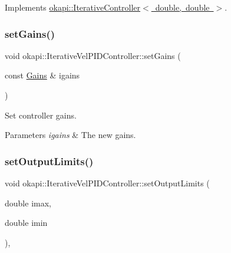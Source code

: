 Implements \mbox{\hyperlink{classokapi_1_1IterativeController_a7c514b702b78be6c45c03b718edce035}{okapi\+::\+Iterative\+Controller$<$ double, double $>$}}.

\mbox{\label{classokapi_1_1IterativeVelPIDController_a0d04321661f6f9e07eecb3e8706cd588}} 
\subsubsection{\texorpdfstring{setGains()}{setGains()}}
{\footnotesize\ttfamily void okapi\+::\+Iterative\+Vel\+P\+I\+D\+Controller\+::set\+Gains (\begin{DoxyParamCaption}\item[{const \mbox{\hyperlink{structokapi_1_1IterativeVelPIDController_1_1Gains}{Gains}} \&}]{igains }\end{DoxyParamCaption})\hspace{0.3cm}{\ttfamily [virtual]}}

Set controller gains.


\begin{DoxyParams}{Parameters}
{\em igains} & The new gains. \\
\hline
\end{DoxyParams}
\mbox{\label{classokapi_1_1IterativeVelPIDController_a02efd865f97b0f2da3f826c1120ec07b}} 
\subsubsection{\texorpdfstring{setOutputLimits()}{setOutputLimits()}}
{\footnotesize\ttfamily void okapi\+::\+Iterative\+Vel\+P\+I\+D\+Controller\+::set\+Output\+Limits (\begin{DoxyParamCaption}\item[{double}]{imax,  }\item[{double}]{imin }\end{DoxyParamCaption})\hspace{0.3cm}{\ttfamily [override]}, {\ttfamily [virtual]}}

